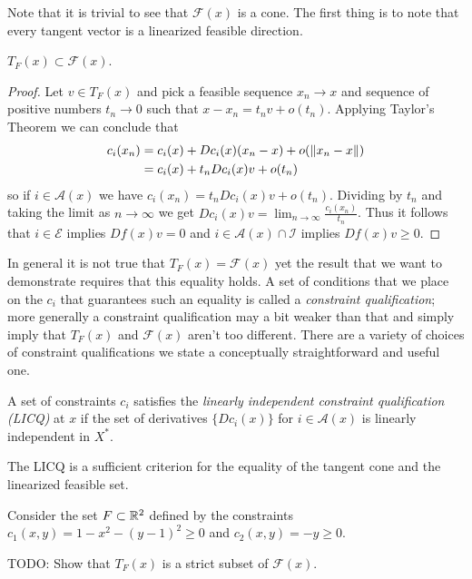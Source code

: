 Note that it is trivial to see that $\mathcal{F}(x)$ is a cone.  The
first thing is to note that every tangent vector is a linearized
feasible direction.

\begin{prop}$T_F(x) \subset \mathcal{F}(x)$.
\end{prop}
\begin{proof}
Let $v \in T_F(x)$ and pick a feasible sequence $x_n \to x$ and
sequence of positive numbers $t_n
\to 0$ such that $x - x_n = t_nv + o(t_n)$.  Applying Taylor's Theorem
we can conclude that 
\begin{align*}
c_i(x_n) &= c_i(x) + Dc_i(x) (x_n - x) + o(\left \lVert x_n-x \right \rVert) \\
&= c_i(x) + t_n Dc_i(x) v + o(t_n) 
\end{align*}
so if $i \in \mathcal{A}(x)$ we have $c_i(x_n) = t_n Dc_i(x) v +
o(t_n)$. Dividing by $t_n$ and taking the limit as $n \to
\infty$ we get $Dc_i(x) v = \lim_{n \to \infty}
\frac{c_i(x_n)}{t_n}$.  Thus it follows that  $i \in \mathcal{E}$
implies $Df(x) v = 0$ and $i \in \mathcal{A}(x) \cap \mathcal{I}$
implies $Df(x) v \geq 0$.
\end{proof}

In general it is not true that $T_F(x) = \mathcal{F}(x)$ yet the
result that we want to demonstrate requires that this equality holds.
A set of conditions that we place on the $c_i$ that guarantees such an
equality is called a \emph{constraint qualification}; more generally a
constraint qualification may a bit weaker than that and simply imply
that $T_F(x)$ and $\mathcal{F}(x)$ aren't too different.  There are a
variety of choices of constraint qualifications we state a
conceptually straightforward and useful one.
\begin{defn}A set of constraints $c_i$ satisfies the \emph{linearly
    independent constraint qualification (LICQ)} at $x$ if the set of
  derivatives $\lbrace Dc_i(x) \rbrace$ for $i \in \mathcal{A}(x)$ is
  linearly independent in $X^*$.
\end{defn}
The LICQ is a sufficient criterion for the equality of the tangent
cone and the linearized feasible set.

\begin{examp}Consider the set $F \subset \mathbb{R}^2$ defined by the
  constraints $c_1(x,y) = 1 - x^2 - (y-1)^2 \geq 0$ and $c_2(x,y) =
  -y \geq 0$.

TODO: Show that $T_F(x)$ is a strict subset of $\mathcal{F}(x)$.
\end{examp}

